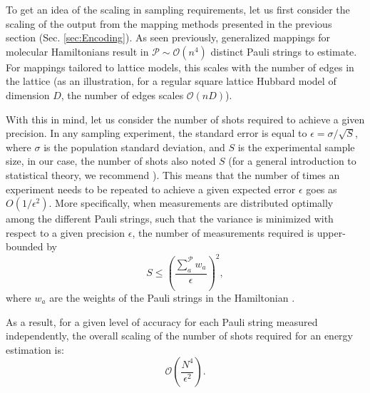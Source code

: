 To get an idea of the scaling in sampling requirements, let us first consider the scaling of the output from the mapping methods presented in the previous section (Sec. \ref{sec:Encoding}). As seen previously, generalized mappings for molecular Hamiltonians result in $\mathcal{P} \sim \mathcal{O}(n^4)$ distinct Pauli strings to estimate. For mappings tailored to lattice models, this scales with the number of edges in the lattice (as an illustration, for a regular square lattice Hubbard model of dimension $D$, the number of edges scales $\mathcal{O}(nD)$).  

With this in mind, let us consider the number of shots required to achieve a given precision. In any sampling experiment, the standard error is equal to $\epsilon = \sigma/\sqrt{S}$, where $\sigma$ is the population standard deviation, and $S$ is the experimental sample size, in our case, the number of shots also noted $S$ (for a general introduction to statistical theory, we recommend \cite{Dekking2005}). This means that the number of times an experiment needs to be repeated to achieve a given expected error $\epsilon$ goes as $O(1/\epsilon^2)$. 
More specifically, when measurements are distributed optimally among the different Pauli strings, such that the variance is minimized with respect to a given precision $\epsilon$, the number of measurements required is upper-bounded by
\begin{equation} \label{eq:measurement_upper_bound}
    S \leqslant \left( \frac{\sum_a^{\mathcal{P}} w_a}{\epsilon} \right)^2,
\end{equation}
where $w_a$ are the weights of the Pauli strings in the Hamiltonian \cite{Wecker2015, Rubin2018}. 

As a result, for a given level of accuracy for each Pauli string measured independently, the overall scaling of the number of shots required for an energy estimation is:
\begin{equation} \label{eq:measurement_scaling}
    \mathcal{O}\left(\frac{N^4}{\epsilon^2}\right).
\end{equation}

